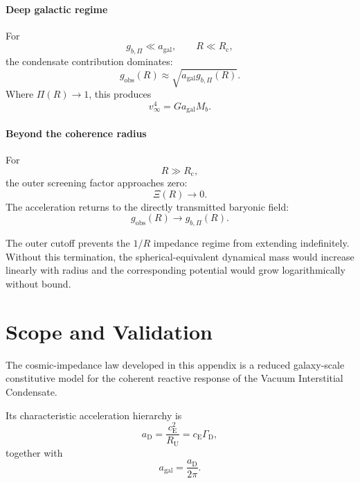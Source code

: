 \paragraph{Deep galactic regime}
For
\begin{equation}
    g_{b,\Pi} \ll a_{\mathrm{gal}}, \qquad R \ll R_{\mathrm{c}},
\end{equation}
the condensate contribution dominates:
\begin{equation}
    g_{\mathrm{obs}}(R) \approx \sqrt{ a_{\mathrm{gal}}g_{b,\Pi}(R) }.
\end{equation}
Where $\Pi(R) \rightarrow 1$, this produces
\begin{equation}
    v_\infty^4 = G a_{\mathrm{gal}} M_b.
\end{equation}

\paragraph{Beyond the coherence radius}
For
\begin{equation}
    R \gg R_{\mathrm{c}},
\end{equation}
the outer screening factor approaches zero:
\begin{equation}
    \Xi(R) \rightarrow 0.
\end{equation}
The acceleration returns to the directly transmitted baryonic field:
\begin{equation}
    g_{\mathrm{obs}}(R) \rightarrow g_{b,\Pi}(R).
\end{equation}

The outer cutoff prevents the $1/R$ impedance regime from extending indefinitely. Without this termination, the spherical-equivalent dynamical mass would increase linearly with radius and the corresponding potential would grow logarithmically without bound.

\section{Scope and Validation}

The cosmic-impedance law developed in this appendix is a reduced galaxy-scale
constitutive model for the coherent reactive response of the Vacuum
Interstitial Condensate.

Its characteristic acceleration hierarchy is
\begin{equation}
    \boxed{
    a_{\mathrm D}
    =
    \frac{
        c_{\mathrm E}^{2}
    }{
        R_{\mathrm U}
    }
    =
    c_{\mathrm E}
    \Gamma_{\mathrm D},
    }
\end{equation}
together with
\begin{equation}
    \boxed{
    a_{\mathrm{gal}}
    =
    \frac{
        a_{\mathrm D}
    }{
        2\pi
    }.
    }
\end{equation}


